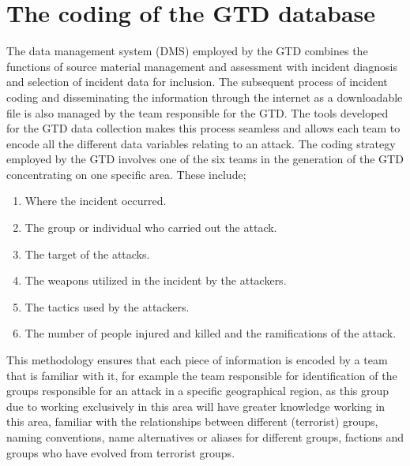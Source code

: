 \section{The coding of the GTD database}
The data management system (DMS) employed by the GTD combines the functions of source material management and assessment with incident diagnosis and selection of incident data for inclusion. The subsequent process of incident coding and disseminating the information through the internet as a downloadable file is also managed by the team responsible for the GTD. The tools developed for the GTD data collection makes this process seamless and allows each team to encode all the different data variables relating to an attack. The coding strategy employed by the GTD involves one of the six teams in the generation of the GTD concentrating on one specific area. These include;
\begin{enumerate}
 \item Where the incident occurred.
 \item  The group or individual who carried out the attack.
 \item The target of the attacks.
 \item The weapons utilized in the incident by the attackers.
 \item The tactics used by the attackers.
 \item The number of people injured and killed and the ramifications of the attack.
 \end{enumerate} 
This methodology ensures that each piece of information is encoded by a team that is familiar with it, for example the team responsible for identification of the groups responsible for an attack in a specific geographical region,  as this group due to working exclusively in this area will have greater knowledge working in this area, familiar with the relationships between different (terrorist) groups, naming conventions, name alternatives or aliases for different groups, factions and groups who have evolved from terrorist groups.
